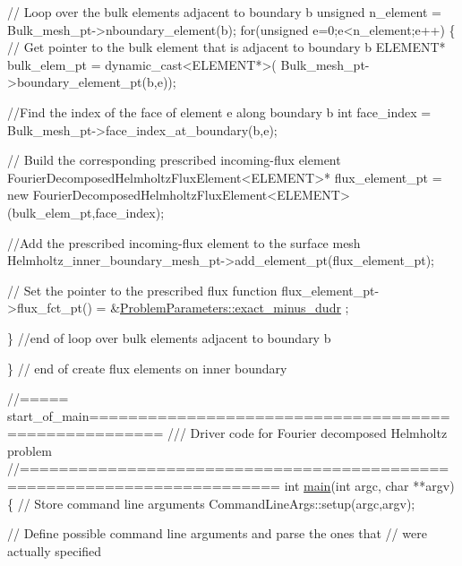 \begin{DoxyCodeInclude}
{{{{\textcolor{comment}{// Loop over the bulk elements adjacent to boundary b}
 \textcolor{keywordtype}{unsigned} n\_element = Bulk\_mesh\_pt->nboundary\_element(b);
 \textcolor{keywordflow}{for}(\textcolor{keywordtype}{unsigned} e=0;e<n\_element;e++)
  \{
   \textcolor{comment}{// Get pointer to the bulk element that is adjacent to boundary b}
   ELEMENT* bulk\_elem\_pt = \textcolor{keyword}{dynamic\_cast<}ELEMENT*\textcolor{keyword}{>}(
    Bulk\_mesh\_pt->boundary\_element\_pt(b,e));
   
   \textcolor{comment}{//Find the index of the face of element e along boundary b }
   \textcolor{keywordtype}{int} face\_index = Bulk\_mesh\_pt->face\_index\_at\_boundary(b,e);
   
   \textcolor{comment}{// Build the corresponding prescribed incoming-flux element}
   FourierDecomposedHelmholtzFluxElement<ELEMENT>* flux\_element\_pt = \textcolor{keyword}{new} 
    FourierDecomposedHelmholtzFluxElement<ELEMENT>(bulk\_elem\_pt,face\_index);
   
   \textcolor{comment}{//Add the prescribed incoming-flux element to the surface mesh}
   Helmholtz\_inner\_boundary\_mesh\_pt->add\_element\_pt(flux\_element\_pt);
   
   \textcolor{comment}{// Set the pointer to the prescribed flux function}
   flux\_element\_pt->flux\_fct\_pt() = &\hyperlink{namespaceProblemParameters_aa544d1f3e384d3283f7113512931ea8f}{ProblemParameters::exact\_minus\_dudr}
      ;

  \} \textcolor{comment}{//end of loop over bulk elements adjacent to boundary b}
 
\} \textcolor{comment}{// end of create flux elements on inner boundary}



\textcolor{comment}{//===== start\_of\_main=====================================================}\textcolor{comment}{}
\textcolor{comment}{/// Driver code for Fourier decomposed Helmholtz problem}
\textcolor{comment}{}\textcolor{comment}{//========================================================================}
\textcolor{keywordtype}{int} \hyperlink{sphere__scattering_8cc_a3c04138a5bfe5d72780bb7e82a18e627}{main}(\textcolor{keywordtype}{int} argc, \textcolor{keywordtype}{char} **argv)
\{
 \textcolor{comment}{// Store command line arguments}
 CommandLineArgs::setup(argc,argv);

 \textcolor{comment}{// Define possible command line arguments and parse the ones that}
 \textcolor{comment}{// were actually specified}
 
}}}}
\end{DoxyCodeInclude}
